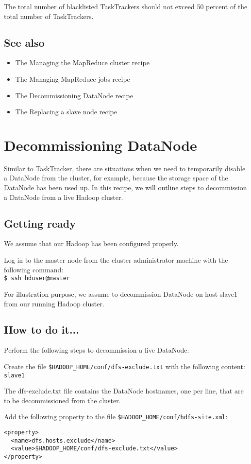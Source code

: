The total number of blacklisted TaskTrackers should not exceed 50 percent of the total number of TaskTrackers.
\subsection*{See also}
\begin{itemize}
  \item The Managing the MapReduce cluster recipe
  \item The Managing MapReduce jobs recipe
  \item The Decommissioning DataNode recipe
  \item The Replacing a slave node recipe
\end{itemize}

\section{Decommissioning DataNode}
Similar to TaskTracker, there are situations when we need to temporarily disable a DataNode from the cluster, for example, because the storage space of the DataNode has been used up. In this recipe, we will outline steps to decommission a DataNode from a live Hadoop cluster.
\subsection*{Getting ready}
We assume that our Hadoop has been configured properly.

Log in to the master node from the cluster administrator machine with the following command: \\
\verb|$ ssh hduser@master|

For illustration purpose, we assume to decommission DataNode on host slave1 from our running Hadoop cluster.
\subsection*{How to do it...}
Perform the following steps to decommission a live DataNode:

Create the file \verb|$HADOOP_HOME/conf/dfs-exclude.txt| with the following content:\\
\verb|slave1|

The dfs-exclude.txt file contains the DataNode hostnames, one per line, that are to be decommissioned from the cluster.

Add the following property to the file \verb|$HADOOP_HOME/conf/hdfs-site.xml|:
\begin{verbatim}
<property>
  <name>dfs.hosts.exclude</name>
  <value>$HADOOP_HOME/conf/dfs-exclude.txt</value>
</property>
\end{verbatim}

